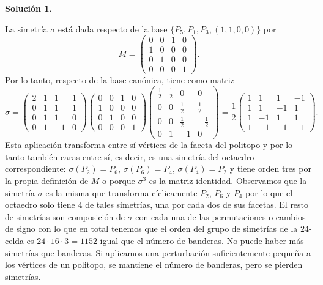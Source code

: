 \documentclass[10pt]{article}
\theoremstyle{definition}
\newtheorem*{sol}{Solución}
\begin{document}
\begin{sol}
\begin{enumerate}[(a)]
    La simetría  $\sigma$ está dada respecto de la base $\{P_5,P_1,P_3,(1,1,0,0)\}$ por 
    \[M=\begin{pmatrix}0 & 0 & 1 & 0\\
    1 & 0 & 0 & 0\\
    0 & 1 & 0 & 0\\
    0 & 0 & 0 & 1
    \end{pmatrix}.\]
    Por lo tanto, respecto de la base canónica, tiene como matriz
    \[\sigma = \begin{pmatrix}2 & 1 & 1 & 1\\
    0 & 1 & 1 & 1\\
    0 & 1 & 1 & 0\\
    0 & 1 & -1 & 0\end{pmatrix}\begin{pmatrix}0 & 0 & 1 & 0\\
    1 & 0 & 0 & 0\\
    0 & 1 & 0 & 0\\
    0 & 0 & 0 & 1
    \end{pmatrix}\begin{pmatrix}\frac{1}{2} & \frac{1}{2} & 0 & 0\\
    0 & 0 & \frac{1}{2} & \frac{1}{2}\\
    0 & 0 & \frac{1}{2} & -\frac{1}{2}\\
    0 & 1 & -1 & 0\end{pmatrix}=\frac{1}{2}\begin{pmatrix}1 & 1 & 1 & -1\\
    1 & 1 & -1 & 1\\
    1 & -1 & 1 & 1\\
    1 & -1 & -1 & -1\end{pmatrix}.\]
    Esta aplicación transforma entre sí vértices de la faceta del politopo y por lo tanto también caras entre sí, es decir, es una simetría del octaedro correspondiente: $\sigma(P_2)=P_6$, $\sigma(P_6)=P_4$, $\sigma(P_4)=P_2$ y tiene orden tres por la propia definición de $M$ o porque $\sigma^3$ es la matriz identidad. Observamos que la simetría $\sigma$ es la misma que transforma cíclicamente $P_2$, $P_6$ y $P_4$ por lo que el octaedro solo tiene $4$ de tales simetrías, una por cada dos de sus facetas. El resto de simetrías son composición de $\sigma$ con cada una de las permutaciones o cambios de signo con lo que en total tenemos que el orden del grupo de simetrías de la $24$-celda es $24\cdot 16 \cdot 3=1152$ igual que el número de banderas. No puede haber más simetrías que banderas. Si aplicamos una perturbación suficientemente pequeña a los vértices de un politopo, se mantiene el número de banderas, pero se pierden simetrías.

\end{enumerate}
\end{sol}
\end{document}
